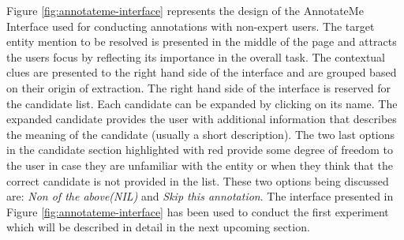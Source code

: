 Figure \ref{fig:annotateme-interface} represents the design of the AnnotateMe Interface used for conducting annotations with non-expert users. The target entity mention to be resolved is presented in the middle of the page and attracts the users focus by reflecting its importance in the overall task. The contextual clues are presented to the right hand side of the interface and are grouped based on their origin of extraction. The right hand side of the interface is reserved for the candidate list. Each candidate can be expanded by clicking on its name. The expanded candidate provides the user with additional information that describes the meaning of the candidate (usually a short description). The two last options in the candidate section highlighted with red provide some degree of freedom to the user in case they are unfamiliar with the entity or when they think that the correct candidate is not provided in the list. These two options being discussed are: \textit{Non of the above(NIL)} and \textit{Skip this annotation}. The interface presented in Figure \ref{fig:annotateme-interface} has been used to conduct the first experiment which will be described in detail in the next upcoming section.